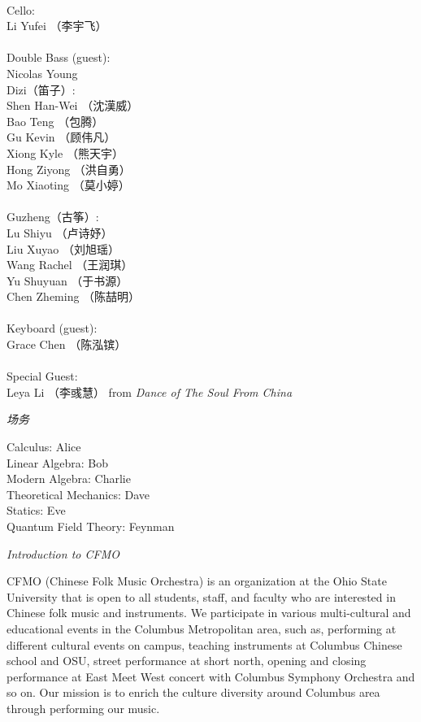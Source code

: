 \documentclass[letter,6pt,poets]{ConcProg}
\begin{document}
\begin{spacing}{1.0}
\begin{multicols}{2}
\\
Cello:\\
Li Yufei （李宇飞）\\
\\
Double Bass (guest):\\
Nicolas Young\\
Dizi（笛子）: 				 \\    
Shen Han-Wei		（沈漢威）     \\
Bao Teng  （包腾）\\
Gu Kevin   （顾伟凡）               \\
Xiong Kyle （熊天宇）\\
Hong Ziyong （洪自勇）\\
Mo Xiaoting （莫小婷）\\
\\
Guzheng（{古筝}）:\\
Lu Shiyu （卢诗妤）\\
Liu Xuyao  （刘旭瑶）\\               
Wang Rachel （王润琪） \\
Yu Shuyuan   （于书源）\\
Chen Zheming  （陈喆明）\\
\\
Keyboard (guest):\\
Grace Chen （陈泓镔）
\\
\\
Special Guest:\\
Leya Li （李彧慧）
 \footnotesize{ from } \emph{ Dance of The Soul From China}
\\
\end{multicols}
\begin{center}
\Large\textsl{ 场务}
\end{center}
\begin{multicols}{2}%
Calculus: Alice\\
Linear Algebra: Bob\\
Modern Algebra: Charlie\\
Theoretical Mechanics: Dave\\
Statics: Eve\\
Quantum Field Theory: Feynman



\end{multicols}
\begin{center}
\Large\textsl{ Introduction to CFMO}
\end{center}

CFMO (Chinese Folk Music Orchestra) is an organization at the Ohio State University that is open to all students, staff, and faculty who are interested in Chinese folk music and instruments. We participate in various multi-cultural and educational events in the Columbus Metropolitan area, such as, performing at different cultural events on campus, teaching instruments at Columbus Chinese school and OSU, street performance at short north, opening and closing performance at East Meet West concert with Columbus Symphony Orchestra and so on. Our mission is to enrich the culture diversity around Columbus area through performing our music.
\end{spacing}
\end{document}

